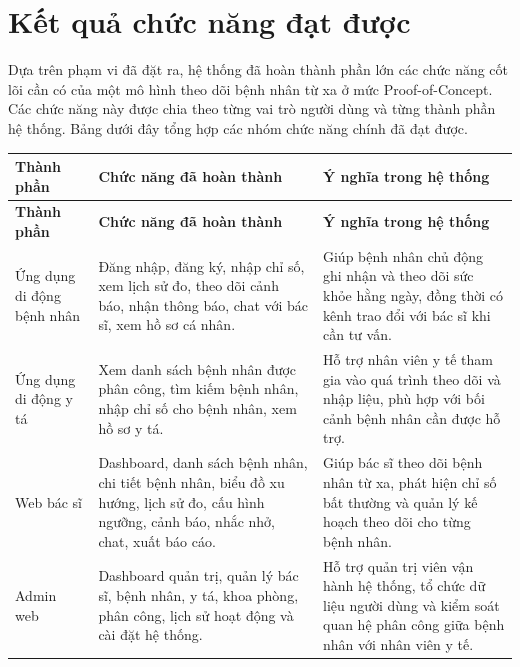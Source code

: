 \section{Kết quả chức năng đạt được}

\par Dựa trên phạm vi đã đặt ra, hệ thống đã hoàn thành phần lớn các chức năng cốt lõi cần có của một mô hình theo dõi bệnh nhân từ xa ở mức Proof-of-Concept. Các chức năng này được chia theo từng vai trò người dùng và từng thành phần hệ thống. Bảng dưới đây tổng hợp các nhóm chức năng chính đã đạt được.

\begin{center}
\begin{longtable}{|p{3.2cm}|p{5cm}|p{6.2cm}|}
    \hline
    \textbf{Thành phần} & \textbf{Chức năng đã hoàn thành} & \textbf{Ý nghĩa trong hệ thống} \\
    \hline
    \endfirsthead
    \hline
    \textbf{Thành phần} & \textbf{Chức năng đã hoàn thành} & \textbf{Ý nghĩa trong hệ thống} \\
    \hline
    \endhead

    Ứng dụng di động bệnh nhân &
    Đăng nhập, đăng ký, nhập chỉ số, xem lịch sử đo, theo dõi cảnh báo, nhận thông báo, chat với bác sĩ, xem hồ sơ cá nhân. &
    Giúp bệnh nhân chủ động ghi nhận và theo dõi sức khỏe hằng ngày, đồng thời có kênh trao đổi với bác sĩ khi cần tư vấn. \\
    \hline

    Ứng dụng di động y tá &
    Xem danh sách bệnh nhân được phân công, tìm kiếm bệnh nhân, nhập chỉ số cho bệnh nhân, xem hồ sơ y tá. &
    Hỗ trợ nhân viên y tế tham gia vào quá trình theo dõi và nhập liệu, phù hợp với bối cảnh bệnh nhân cần được hỗ trợ. \\
    \hline

    Web bác sĩ &
    Dashboard, danh sách bệnh nhân, chi tiết bệnh nhân, biểu đồ xu hướng, lịch sử đo, cấu hình ngưỡng, cảnh báo, nhắc nhở, chat, xuất báo cáo. &
    Giúp bác sĩ theo dõi bệnh nhân từ xa, phát hiện chỉ số bất thường và quản lý kế hoạch theo dõi cho từng bệnh nhân. \\
    \hline

    Admin web &
    Dashboard quản trị, quản lý bác sĩ, bệnh nhân, y tá, khoa phòng, phân công, lịch sử hoạt động và cài đặt hệ thống. &
    Hỗ trợ quản trị viên vận hành hệ thống, tổ chức dữ liệu người dùng và kiểm soát quan hệ phân công giữa bệnh nhân với nhân viên y tế. \\
    \hline


\end{longtable}
\end{center}
